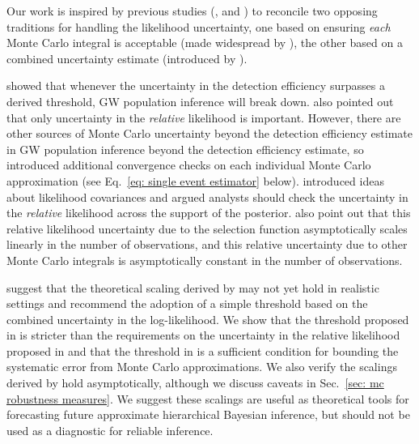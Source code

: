 Our work is inspired by previous studies (\citet{Farr:2019rap, Essick:2022ojx}, and \citet{Talbot:2023pex}) to reconcile two opposing traditions for handling the likelihood uncertainty, one based on ensuring \textit{each} Monte Carlo integral is acceptable (made widespread by \citet{KAGRA:2021duu}), the other based on a combined uncertainty estimate (introduced by \citet{Essick:2022ojx}). 

\citet{Farr:2019rap} showed that whenever the uncertainty in the detection efficiency surpasses a derived threshold, \ac{GW} population inference will break down. \citet{Farr:2019rap} also pointed out that only uncertainty in the \textit{relative} likelihood is important. However, there are other sources of Monte Carlo uncertainty beyond the detection efficiency estimate in \ac{GW} population inference beyond the detection efficiency estimate, so \citet{KAGRA:2021duu} introduced additional convergence checks on each individual Monte Carlo approximation (see  Eq.~\ref{eq: single event estimator} below). \citet{Essick:2022ojx} introduced ideas about likelihood covariances and argued analysts should check the uncertainty in the \textit{relative} likelihood across the support of the posterior. \citet{Essick:2022ojx} also point out that this relative likelihood uncertainty due to the selection function asymptotically scales linearly in the number of observations, and this relative uncertainty due to other Monte Carlo integrals is asymptotically constant in the number of observations. 

\citet{Talbot:2023pex} suggest that the theoretical scaling derived by \citet{Essick:2022ojx} may not yet hold in realistic settings and recommend the adoption of a simple threshold based on the combined uncertainty in the log-likelihood. We show that the threshold proposed in \citet{Talbot:2023pex} is stricter than the requirements on the uncertainty in the relative likelihood proposed in \citet{Essick:2022ojx} and that the threshold in \citet{Talbot:2023pex} is a sufficient condition for bounding the systematic error from Monte Carlo approximations. We also verify the scalings derived by \citet{Essick:2022ojx} hold asymptotically, although we discuss caveats in Sec.~\ref{sec: mc robustness measures}. We suggest these scalings are useful as theoretical tools for forecasting future approximate hierarchical Bayesian inference, but should not be used as a diagnostic for reliable inference.

